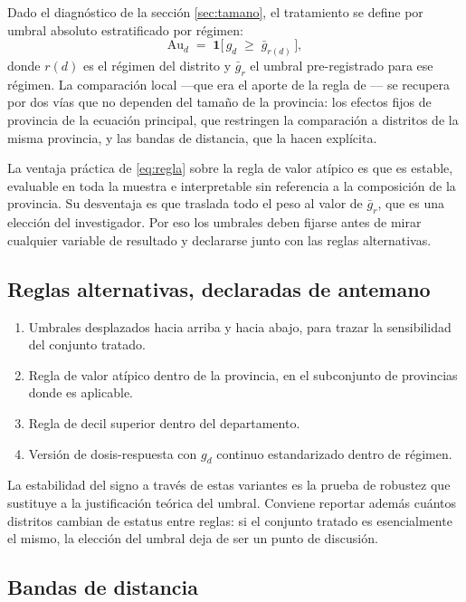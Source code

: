\documentclass[11pt,a4paper]{article}
\newcommand{\Au}{\mathrm{Au}}
\begin{document}
Dado el diagnóstico de la sección \ref{sec:tamano}, el tratamiento se define por umbral absoluto estratificado por régimen:
\begin{equation}
\Au_d \;=\; \mathbf{1}\bigl[\, g_d \;\geq\; \bar{g}_{r(d)} \,\bigr],
\label{eq:regla}
\end{equation}
donde $r(d)$ es el régimen del distrito y $\bar{g}_r$ el umbral pre-registrado para ese régimen. La comparación local ---que era el aporte de la regla de \citet{braakmann2024}--- se recupera por dos vías que no dependen del tamaño de la provincia: los efectos fijos de provincia de la ecuación principal, que restringen la comparación a distritos de la misma provincia, y las bandas de distancia, que la hacen explícita.

La ventaja práctica de \eqref{eq:regla} sobre la regla de valor atípico es que es estable, evaluable en toda la muestra e interpretable sin referencia a la composición de la provincia. Su desventaja es que traslada todo el peso al valor de $\bar{g}_r$, que es una elección del investigador. Por eso los umbrales deben fijarse antes de mirar cualquier variable de resultado y declararse junto con las reglas alternativas.

\subsection{Reglas alternativas, declaradas de antemano}

\begin{enumerate}[leftmargin=1.6em,itemsep=2pt]
\item Umbrales desplazados hacia arriba y hacia abajo, para trazar la sensibilidad del conjunto tratado.
\item Regla de valor atípico dentro de la provincia, en el subconjunto de provincias donde es aplicable.
\item Regla de decil superior dentro del departamento.
\item Versión de dosis-respuesta con $g_d$ continuo estandarizado dentro de régimen.
\end{enumerate}

La estabilidad del signo a través de estas variantes es la prueba de robustez que sustituye a la justificación teórica del umbral. Conviene reportar además cuántos distritos cambian de estatus entre reglas: si el conjunto tratado es esencialmente el mismo, la elección del umbral deja de ser un punto de discusión.

\subsection{Bandas de distancia}
\end{document}
